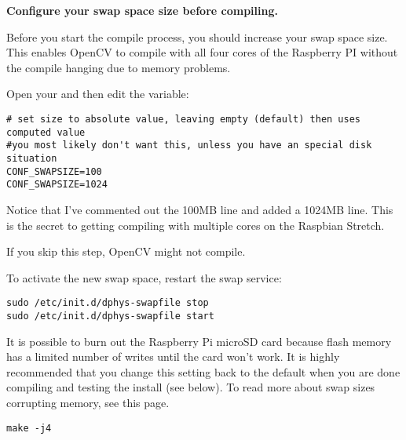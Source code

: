 \medskip









\medskip


\textbf{Configure your swap space size before compiling.}


Before you start the compile process, you should increase your swap space size. This enables OpenCV to compile with all four cores of the Raspberry PI without the compile hanging due to memory problems.

Open your   and then edit the 
  variable:

\begin{verbatim}
# set size to absolute value, leaving empty (default) then uses computed value
#you most likely don't want this, unless you have an special disk situation
CONF_SWAPSIZE=100
CONF_SWAPSIZE=1024
\end{verbatim}

Notice that I've commented out the 100MB line and added a 1024MB line. This is the secret to getting compiling with multiple cores on the Raspbian Stretch.

If you skip this step, OpenCV might not compile.

To activate the new swap space, restart the swap service:

\begin{verbatim}
sudo /etc/init.d/dphys-swapfile stop
sudo /etc/init.d/dphys-swapfile start
\end{verbatim}
It is possible to burn out the Raspberry Pi microSD card because flash memory has a limited number of writes until the card won’t work. It is highly recommended that you change this setting back to the default when you are done compiling and testing the install (see below). To read more about swap sizes corrupting memory, see this page.

\begin{verbatim}
make -j4
\end{verbatim}

